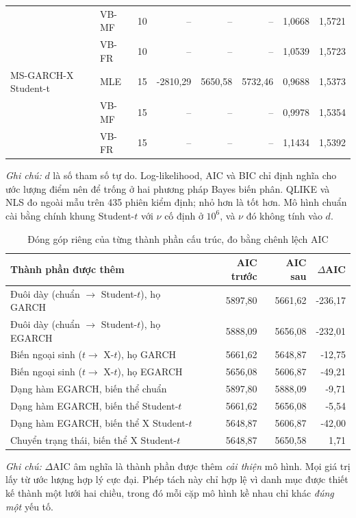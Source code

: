 \begin{table}[H]
\begin{tabular}{llrrrrrr}
 & VB-MF & 10 & -- & -- & -- & 1,0668 & 1,5721 \\
 & VB-FR & 10 & -- & -- & -- & 1,0539 & 1,5723 \\
MS-GARCH-X Student-t & MLE & 15 & -2810,29 & 5650,58 & 5732,46 & 0,9688 & 1,5373 \\
 & VB-MF & 15 & -- & -- & -- & 0,9978 & 1,5354 \\
 & VB-FR & 15 & -- & -- & -- & 1,1434 & 1,5392 \\
\bottomrule
\end{tabular}
\vspace{0.3em}
\raggedright\scriptsize
\emph{Ghi chú:} $d$ là số tham số tự do. Log-likelihood, AIC và BIC chỉ định nghĩa cho ước lượng điểm nên để trống ở hai phương pháp Bayes biến phân. QLIKE và NLS đo ngoài mẫu trên 435 phiên kiểm định; nhỏ hơn là tốt hơn. Mô hình chuẩn cài bằng chính khung Student-$t$ với $\nu$ cố định ở $10^6$, và $\nu$ đó không tính vào $d$.
\end{table}

\begin{table}[H]
\centering\footnotesize
\caption{Đóng góp riêng của từng thành phần cấu trúc, đo bằng chênh lệch AIC}
\label{tab:buoc1-phan-ra}
\begin{tabular}{lrrr}
\toprule
\textbf{Thành phần được thêm} & AIC trước & AIC sau & $\Delta$AIC \\
\midrule
Đuôi dày (chuẩn $\to$ Student-$t$), họ GARCH & 5897,80 & 5661,62 & -236,17 \\
Đuôi dày (chuẩn $\to$ Student-$t$), họ EGARCH & 5888,09 & 5656,08 & -232,01 \\
Biến ngoại sinh ($t \to$ X-$t$), họ GARCH & 5661,62 & 5648,87 & -12,75 \\
Biến ngoại sinh ($t \to$ X-$t$), họ EGARCH & 5656,08 & 5606,87 & -49,21 \\
Dạng hàm EGARCH, biến thể chuẩn & 5897,80 & 5888,09 & -9,71 \\
Dạng hàm EGARCH, biến thể Student-$t$ & 5661,62 & 5656,08 & -5,54 \\
Dạng hàm EGARCH, biến thể X Student-$t$ & 5648,87 & 5606,87 & -42,00 \\
Chuyển trạng thái, biến thể X Student-$t$ & 5648,87 & 5650,58 & 1,71 \\
\bottomrule
\end{tabular}
\vspace{0.3em}
\raggedright\scriptsize
\emph{Ghi chú:} $\Delta$AIC âm nghĩa là thành phần được thêm \emph{cải thiện} mô hình. Mọi giá trị lấy từ ước lượng hợp lý cực đại. Phép tách này chỉ hợp lệ vì danh mục được thiết kế thành một lưới hai chiều, trong đó mỗi cặp mô hình kề nhau chỉ khác \emph{đúng một} yếu tố.
\end{table}

